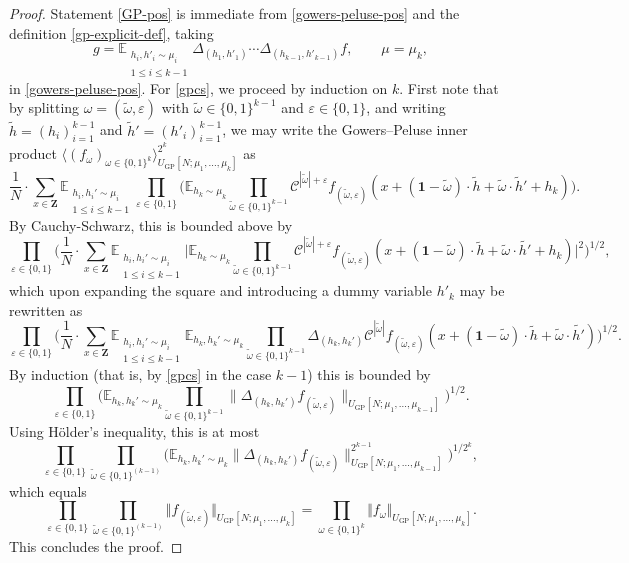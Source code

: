 \documentclass[11pt,reqno]{amsart}
\numberwithin{equation}{section}
\theoremstyle{definition}
\theoremstyle{remark}
\newcommand{\snorm}[1]{\lVert#1\rVert}
\newcommand{\mb}{\mathbb}
\newcommand{\mc}{\mathcal}
\newcommand{\eps}{\varepsilon}
\renewcommand{\le}{\leqslant}
\newcommand\Z{\mathbf{Z}}
\newcommand\E{\mb{E}}
\newcommand\GP{\operatorname{GP}}
\begin{document}
\begin{proof}
Statement \cref{GP-pos} is immediate from \cref{gowers-peluse-pos} and the definition \cref{gp-explicit-def}, taking 
\[ g = \E_{\substack{h_i, h'_i \sim \mu_i \\ 1 \le i \le k-1}} \Delta_{(h_1, h'_1)} \cdots \Delta_{(h_{k-1}, h'_{k-1})} f,\qquad \mu = \mu_k,\] in \cref{gowers-peluse-pos}.
For \cref{gpcs}, we proceed by induction on $k$. First note that by splitting $\omega = (\tilde\omega, \eps)$ with $\tilde\omega \in \{0,1\}^{k-1}$ and $\eps \in \{0,1\}$, and writing $\tilde{h} = (h_i)_{i=1}^{k-1}$ and $\tilde{h}' = (h'_i)_{i=1}^{k-1}$,
we may write the Gowers--Peluse inner product $\langle (f_{\omega})_{\omega \in \{0,1\}^k}\rangle^{2^k}_{U_{\GP}[N;\mu_1,\dots, \mu_k]}$   as \[ \frac{1}{N} \cdot \sum_{x\in \Z}\E_{\substack{h_i,h_i'\sim \mu_i\\1\le i\le k-1}}\prod_{\eps \in \{0,1\}}\bigg(\E_{h_k\sim \mu_k}\prod_{\tilde\omega\in\{0,1\}^{k-1}} \mc{C}^{|\tilde{\omega}| + \eps} f_{(\tilde\omega,\eps)}(x + (\mathbf{1}-\tilde\omega)\cdot \tilde{h} + \tilde\omega\cdot \tilde{h}' +  h_k)\bigg). \]
By Cauchy-Schwarz, this is bounded above by
\[ \prod_{\eps \in\{0,1\}}\bigg(\frac{1}{N} \cdot\sum_{x\in \Z}\E_{\substack{h_i,h_i'\sim \mu_i\\1\le i\le k-1}}\Big|\E_{h_k\sim \mu_k}\prod_{\tilde{\omega}\in\{0,1\}^{k-1}}\mc{C}^{|\tilde{\omega}| + \eps}f_{(\tilde{\omega},\eps)}(x + (\mathbf{1}-\tilde{\omega})\cdot \tilde{h} + \tilde{\omega}\cdot \tilde{h'} + h_k)\Big|^{2}\bigg)^{1/2},\] which upon expanding the square and introducing a dummy variable $h'_k$ may be rewritten as 
\[ \prod_{\eps \in\{0,1\}}\bigg(\frac{1}{N} \cdot\sum_{x\in \Z}\E_{\substack{h_i,h_i'\sim \mu_i\\1\le i\le k-1}}\E_{h_k,h_k' \sim \mu_k}\prod_{\tilde{\omega}\in\{0,1\}^{k-1}}\Delta_{(h_k,h_k')}\mc{C}^{|\tilde{\omega}|} f_{(\tilde{\omega},\eps)}(x + (\mathbf{1}-\tilde{\omega})\cdot \tilde{h} + \tilde{\omega}\cdot \tilde{h'})\bigg)^{1/2}.\]
By induction (that is, by \cref{gpcs} in the case $k - 1$) this is bounded by
\[ \prod_{\eps \in\{0,1\}} \bigg(\E_{h_k,h_k'\sim \mu_k}\prod_{\tilde{\omega}\in \{0,1\}^{k-1}}\snorm{\Delta_{(h_k,h_k')}f_{(\tilde{\omega},\eps)}}_{U_{\GP}[N;\mu_1,\ldots,\mu_{k-1}]}\bigg)^{1/2} . \] Using H\"older's inequality, this is at most
\[ \prod_{\eps \in\{0,1\}} \prod_{\tilde{\omega}\in \{0,1\}^{(k-1)}}\bigg(\E_{h_k,h_k' \sim \mu_k}\snorm{\Delta_{(h_k,h_k')}f_{(\tilde{\omega},\eps)}}_{U_{\GP}[N;\mu_1,\ldots,\mu_{k-1}]}^{2^{k-1}}\bigg)^{1/{2^{k}}},\] which equals
\[ \prod_{\eps \in\{0,1\}} \prod_{\tilde{\omega}\in \{0,1\}^{(k-1)}} 
 \big\Vert f_{(\tilde{\omega},\eps)} \big\Vert_{U_{\GP}[N;\mu_1,\ldots,\mu_{k}]} = \prod_{\omega \in \{0,1\}^k} \Vert f_{\omega} \Vert_{U_{\GP}[N;\mu_1,\dots, \mu_k]}.\] 
 This concludes the proof.
 \end{proof}
\end{document}
